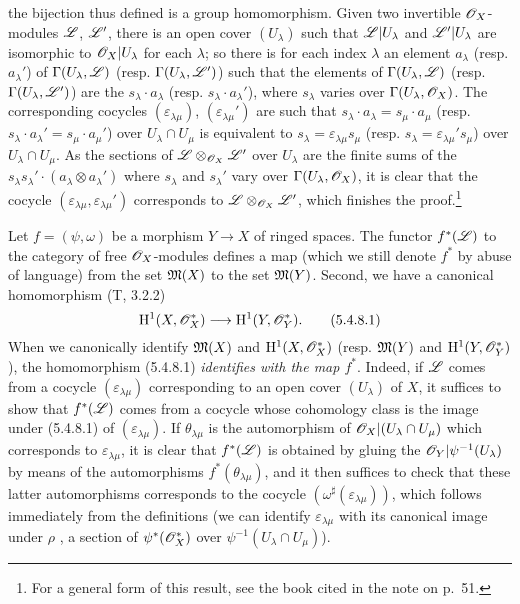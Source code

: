 \begin{env}[5.4.7]
the bijection thus defined is a group homomorphism. Given two invertible
$\mathscr{O}_X$-modules $\mathscr{L}$, $\mathscr{L}'$, there is an open cover $(U_\lambda)$ such
that $\mathscr{L}|U_\lambda$ and $\mathscr{L}'|U_\lambda$ are isomorphic to
$\mathscr{O}_X|U_\lambda$ for each $\lambda$; so there is for each index $\lambda$ an
element $a_\lambda$ (resp. $a_\lambda'$) of $\Gamma(U_\lambda,\mathscr{L})$
(resp. $\Gamma(U_\lambda,\mathscr{L}')$) such that the elements of
$\Gamma(U_\lambda,\mathscr{L})$ (resp. $\Gamma(U_\lambda,\mathscr{L}')$) are the
$s_\lambda\cdot a_\lambda$ (resp. $s_\lambda\cdot a_\lambda'$), where
$s_\lambda$ varies over $\Gamma(U_\lambda,\mathscr{O}_X)$. The corresponding cocycles
$(\varepsilon_{\lambda\mu})$, $(\varepsilon_{\lambda\mu}')$ are such that
$s_\lambda\cdot a_\lambda=s_\mu\cdot a_\mu$
(resp. $s_\lambda\cdot a_\lambda'=s_\mu\cdot a_\mu'$) over $U_\lambda\cap U_\mu$
is equivalent to $s_\lambda=\varepsilon_{\lambda\mu}s_\mu$
(resp. $s_\lambda=\varepsilon_{\lambda\mu}' s_\mu$) over $U_\lambda\cap U_\mu$.
As the sections of $\mathscr{L}\otimes_{\mathscr{O}_X}\mathscr{L}'$ over $U_\lambda$ are the
finite sums of the $s_\lambda s_\lambda'\cdot(a_\lambda\otimes a_\lambda')$
where $s_\lambda$ and $s_\lambda'$ vary over $\Gamma(U_\lambda,\mathscr{O}_X)$, it is
clear that the cocycle $(\varepsilon_{\lambda\mu},\varepsilon_{\lambda\mu}')$
corresponds to $\mathscr{L}\otimes_{\mathscr{O}_X}\mathscr{L}'$, which finishes the
proof.\footnote{For a general form of this result, see the book cited in the
note on p.~51.}
\end{env}

\begin{env}[5.4.8]
\label{0.5.4.8}
Let $f=(\psi,\omega)$ be a morphism $Y\to X$ of ringed spaces. The functor
$f^*(\mathscr{L})$ to the category of free $\mathscr{O}_X$-modules defines a map (which we
still denote $f^*$ by abuse of language) from the set $\mathfrak{M}(X)$ to the
set $\mathfrak{M}(Y)$. Second, we have a canonical homomorphism (T, 3.2.2)
\[
  \mathrm{H}^1(X,\mathscr{O}_X^*)\longrightarrow\mathrm{H}^1(Y,\mathscr{O}_Y^*).
  \tag{5.4.8.1}
\]
When we canonically identify  $\mathfrak{M}(X)$ and
$\mathrm{H}^1(X,\mathscr{O}_X^*)$ (resp. $\mathfrak{M}(Y)$ and $\mathrm{H}^1(Y,\mathscr{O}_Y^*)$), the
homomorphism (5.4.8.1) {\em identifies with the map $f^*$}. Indeed, if $\mathscr{L}$
comes from a cocycle $(\varepsilon_{\lambda\mu})$ corresponding to an open cover
$(U_\lambda)$ of $X$, it suffices to show that $f^*(\mathscr{L})$ comes from a
cocycle whose cohomology class is the image under (5.4.8.1) of
$(\varepsilon_{\lambda\mu})$. If $\theta_{\lambda\mu}$ is the automorphism of
$\mathscr{O}_X|(U_\lambda\cap U_\mu)$ which corresponds to $\varepsilon_{\lambda\mu}$,
it is clear that $f^*(\mathscr{L})$ is obtained by gluing the
$\mathscr{O}_Y|\psi^{-1}(U_\lambda)$ by means of the automorphisms
$f^*(\theta_{\lambda\mu})$, and it then suffices to check that these latter
automorphisms corresponds to the cocycle
$(\omega^\sharp(\varepsilon_{\lambda\mu}))$, which follows immediately from the
definitions (we can identify $\varepsilon_{\lambda\mu}$ with its canonical image
under $\rho$ , a section of $\psi^*(\mathscr{O}_X^*)$ over
$\psi^{-1}(U_\lambda\cap U_\mu)$).
\end{env}

